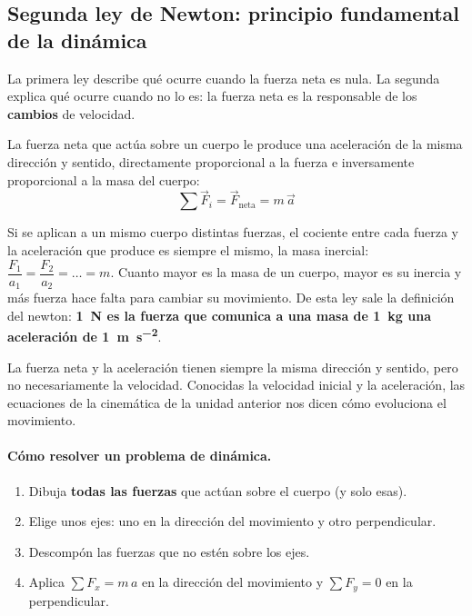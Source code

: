 \subsection{Segunda ley de Newton: principio fundamental de la dinámica}

La primera ley describe qué ocurre cuando la fuerza neta es nula. La segunda explica qué ocurre cuando no lo es: la fuerza neta es
la responsable de los \textbf{cambios} de velocidad.

\begin{definition}
    La fuerza neta que actúa sobre un cuerpo le produce una aceleración de la misma dirección y sentido, directamente proporcional a
    la fuerza e inversamente proporcional a la masa del cuerpo:
    \[ \sum \vec{F}_i = \vec{F}_{\text{neta}} = m\,\vec{a} \]
\end{definition}

Si se aplican a un mismo cuerpo distintas fuerzas, el cociente entre cada fuerza y la aceleración que produce es siempre el mismo, la
masa inercial: \(\dfrac{F_1}{a_1} = \dfrac{F_2}{a_2} = \dots = m\). Cuanto mayor es la masa de un cuerpo, mayor es su inercia y más
fuerza hace falta para cambiar su movimiento. De esta ley sale la definición del newton: \textbf{\qty{1}{\newton} es la fuerza que
comunica a una masa de \qty{1}{\kg} una aceleración de \qty{1}{\m\per\s\squared}}.

\begin{remark}
    La fuerza neta y la aceleración tienen siempre la misma dirección y sentido, pero no necesariamente la velocidad. Conocidas la
    velocidad inicial y la aceleración, las ecuaciones de la cinemática de la unidad anterior nos dicen cómo evoluciona el movimiento.
\end{remark}

\paragraph{Cómo resolver un problema de dinámica.}
\begin{enumerate}[label=\numberballgreen]
    \item Dibuja \textbf{todas las fuerzas} que actúan sobre el cuerpo (y solo esas).
    \item Elige unos ejes: uno en la dirección del movimiento y otro perpendicular.
    \item Descompón las fuerzas que no estén sobre los ejes.
    \item Aplica \(\sum F_x = m\,a\) en la dirección del movimiento y \(\sum F_y = 0\) en la perpendicular.
\end{enumerate}


